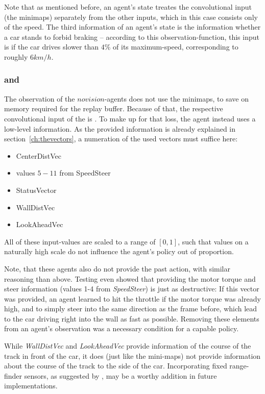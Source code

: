 Note that as mentioned before, an agent's state treates the convolutional input (the minimaps) separately from the other inputs, which in this case consists only of the speed. The third information of an agent's state is the information whether a car stands to forbid braking -- according to this observation-function, this input is  if the car drives slower than $4\%$ of its maximum-speed, corresponding to roughly $6km/h$.

\subsubsection{ and }

The observation of the $novision$-agents does not use the minimaps, to save on memory required for the replay buffer. Because of that, the respective convolutional input of the  is . To make up for that loss, the agent instead uses a low-level information. As the provided information is already explained in section~\ref{ch:thevectors}, a numeration of the used vectors must suffice here:
\begin{itemize}[noitemsep]
	\item CenterDistVec
	\item values $5-11$ from SpeedSteer 
	\item StatusVector
	\item WallDistVec
	\item LookAheadVec
\end{itemize}

All of these input-values are scaled to a range of $[0,1]$, such that values on a naturally high scale do not influence the agent's policy out of proportion.

Note, that these agents also do not provide the past action, with similar reasoning than above. Testing even showed that providing the motor torque and steer information (values 1-4 from \textit{SpeedSteer}) is just as destructive: If this vector was provided, an agent learned to hit the throttle if the motor torque was already high, and to simply steer into the same direction as the frame before, which lead to the car driving right into the wall as fast as possible. Removing these elements from an agent's observation was a necessary condition for a capable policy.

While \textit{WallDistVec} and \textit{LookAheadVec} provide information of the course of the track in front of the car, it does (just like the mini-maps) not provide information about the course of the track to the side of the car. Incorporating fixed range-finder sensors, as suggested by \cite{loiacono_simulated_2013}, may be a worthy addition in future implementations.